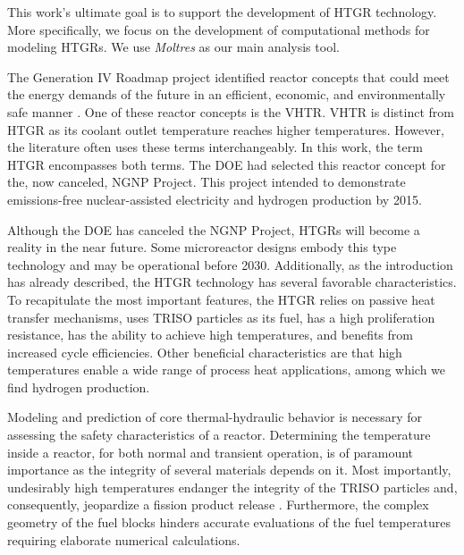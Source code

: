 \documentclass[11pt,letterpaper]{article}
\begin{document}
This work's ultimate goal is to support the development of \gls{HTGR} technology.
More specifically, we focus on the development of computational methods for modeling \glspl{HTGR}.
We use \textit{Moltres} as our main analysis tool.

The Generation IV Roadmap project identified reactor concepts that could meet the energy demands of the future in an efficient, economic, and environmentally safe manner \cite{macdonald_ngnp_2003}.
One of these reactor concepts is the \gls{VHTR}.
\gls{VHTR} is distinct from \gls{HTGR} as its coolant outlet temperature reaches higher temperatures.
However, the literature often uses these terms interchangeably.
In this work, the term \gls{HTGR} encompasses both terms.
The \gls{DOE} had selected this reactor concept for the, now canceled, \gls{NGNP} Project.
This project intended to demonstrate emissions-free nuclear-assisted electricity and hydrogen production by 2015.

Although the \gls{DOE} has canceled the \gls{NGNP} Project, \glspl{HTGR} will become a reality in the near future.
Some microreactor designs embody this type technology and may be operational before 2030.
Additionally, as the introduction has already described, the \gls{HTGR} technology has several favorable characteristics.
To recapitulate the most important features, the \gls{HTGR} relies on passive heat transfer mechanisms, uses TRISO particles as its fuel, has a high proliferation resistance, has the ability to achieve high temperatures, and benefits from increased cycle efficiencies.
Other beneficial characteristics are that high temperatures enable a wide range of process heat applications, among which we find hydrogen production.

Modeling and prediction of core thermal-hydraulic behavior is necessary for assessing the safety characteristics of a reactor.
Determining the temperature inside a reactor, for both normal and transient operation, is of paramount importance as the integrity of several materials depends on it.
Most importantly, undesirably high temperatures endanger the integrity of the TRISO particles and, consequently, jeopardize a fission product release \cite{tak_numerical_2008}.
Furthermore, the complex geometry of the fuel blocks hinders accurate evaluations of the fuel temperatures requiring elaborate numerical calculations.
\end{document}
